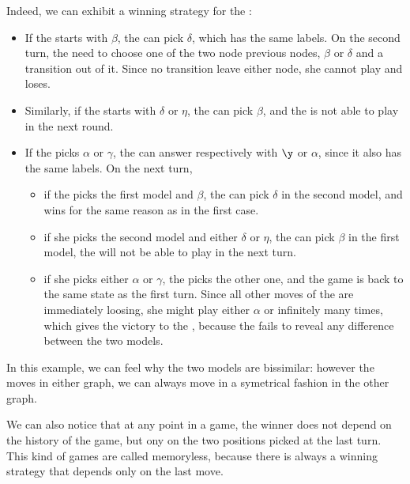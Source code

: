 \begin{example}
    Indeed, we can exhibit a winning strategy for the \Defender:
    \begin{itemize}
        \item If the \Attacker starts with $\beta$, the \Defender
            can pick $\delta$, which has the same labels.
            On the second turn, the \Attacker need to choose
            one of the two node previous nodes, $\beta$ or $\delta$
            and a transition out of it. Since no transition leave either node,
            she cannot play and loses.
        \item Similarly, if the \Attacker starts with $\delta$ or $\eta$, the \Defender
            can pick $\beta$, and the \Attacker is not able to play in the next round.
        \item If the \Attacker picks $\alpha$ or $\gamma$,
            the \Defender can answer respectively with $\y$ or $\alpha$,
            since it also has the same labels. On the next turn,
            \begin{itemize}
                \item if the \Attacker
                    picks the first model and $\beta$, the \Defender can pick $\delta$
                    in the second model, and wins for the same reason as in the first case.
                \item if she picks the second model and either $\delta$ or $\eta$,
                    the \Defender can pick $\beta$ in the first model, the \Attacker will not be able to play
                    in the next turn.
                \item if she picks either $\alpha$ or $\gamma$,
                    the \Defender picks the other one, and the game is back to the same
                    state as the first turn.
                    Since all other moves of the \Attacker are immediately loosing,
                    she might play either $\alpha$ or \y infinitely many times,
                    which gives the victory to the \Defender, because the \Attacker
                    fails to reveal any difference between the two models.
            \end{itemize}
    \end{itemize}

    In this example, we can feel why the two models are bissimilar: however
    the \Attacker moves in either graph, we can always move in a symetrical fashion in
    the other graph.

    We can also notice that at any point in a game, the winner does not depend on the history of the game,
    but ony on the two positions picked at the last turn.
    This kind of games are called memoryless, because there is always a winning strategy
    that depends only on the last move.
\end{example}

